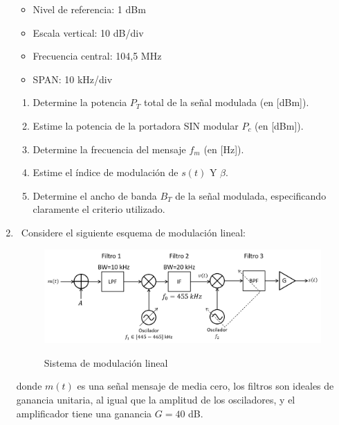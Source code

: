 \begin{enumerate}
\begin{itemize}
	\item Nivel de referencia: 1 dBm
	\item Escala vertical: 10 dB/div
	\item Frecuencia central: 104,5 MHz
	\item SPAN: 10 kHz/div
\end{itemize}

\begin{enumerate}
	\item Determine la potencia $P_T$ total de la señal modulada (en [dBm]).
	\item Estime la potencia de la portadora SIN modular $P_c $  (en [dBm]).
	\item Determine la frecuencia del mensaje $f_m$  (en [Hz]).
	\item Estime el índice de modulación de $s(t)$ Y $\beta$.
	\item Determine el ancho de banda $B_T$ de la señal modulada, especificando claramente el criterio utilizado. 
	
\end{enumerate}

\item~Considere el siguiente esquema de modulación lineal: 

\vspace{200px}
\begin{figure}[h!]
	\captionsetup{justification = raggedright, singlelinecheck = false}
	\caption{Sistema de modulación lineal} 
	\centering
	\includegraphics[scale=0.42]{Imagenes/Esquema1.png}
	\label{fig:Esquema1}
\end{figure}

donde $m(t)$ es una señal mensaje de media cero, los filtros son ideales de ganancia unitaria, al igual que la amplitud de los osciladores, y el amplificador tiene una ganancia $G=40$ dB.


\end{enumerate}
